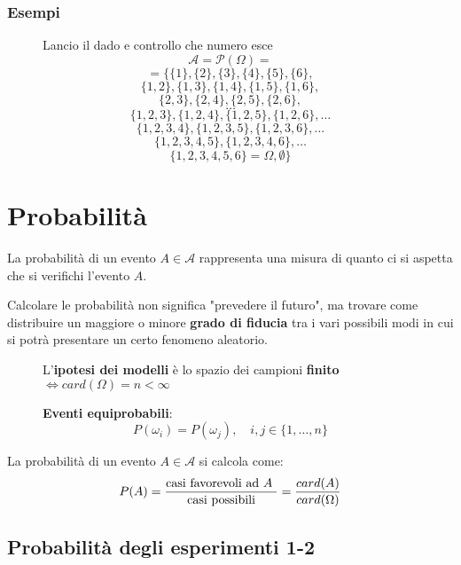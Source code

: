 \documentclass[a4paper]{article}
\theoremstyle{break}
\theoremstyle{break}
\theoremstyle{break}
\theoremstyle{break}
\begin{document}
\subsubsection{Esempi}
\begin{figure}[H]
  \begin{example}
    Lancio il dado e controllo che numero esce
    \[
      \mathcal{A} = \mathcal{P}(\Omega) =
    \] 
    \[
      = \big\{ \{1\} ,\{2\} ,\{3\}, \{4\}, \{5\}, \{6\},
      \]
      \[
      \{1,2\}, \{1,3\}, \{1,4\}, \{1,5\}, \{1,6\},
    \]
    \[
      \{2,3\}, \{2,4\}, \{2,5\}, \{2,6\},
    \]
    \[
      \ldots
    \]
    \[
      \{1,2,3\}, \{1,2,4\}, \{1,2,5\}, \{1,2,6\},\ldots
    \]
    \[
      \{1,2,3,4\}, \{1,2,3,5\}, \{1,2,3,6\},\ldots
    \]
    \[
      \{1,2,3,4,5\}, \{1,2,3,4,6\},\ldots
    \]
    \[
    \{1,2,3,4,5,6\} = \Omega, \emptyset \big\}
    \] 
  \end{example}
\end{figure}

\section{Probabilità}
La probabilità di un evento \( A \in \mathcal{A} \) rappresenta una misura di quanto
ci si aspetta che si verifichi l'evento \( A \).

Calcolare le probabilità non significa "prevedere il futuro", ma trovare come distribuire
un maggiore o minore \textbf{grado di fiducia} tra i vari possibili modi in cui si potrà
presentare un certo fenomeno aleatorio.

\begin{figure}[H]
  \begin{define}
    L'\textbf{ipotesi dei modelli} è lo spazio dei campioni \textbf{finito} \( \Leftrightarrow
    card(\Omega) = n < \infty\) 

    \textbf{Eventi equiprobabili}:
    \[
    P(\omega_i) = P(\omega_j), \quad i,j \in \{1, \ldots, n\} 
    \] 
  \end{define}
\end{figure}

La probabilità di un evento \( A \in \mathcal{A} \) si calcola come:
\[
P(A) = \frac{\text{casi favorevoli ad \( A \) }}{\text{casi possibili}} = \frac{card(A)}{card(\Omega)}
\] 

\subsection{Probabilità degli esperimenti 1-2}
\end{document}
